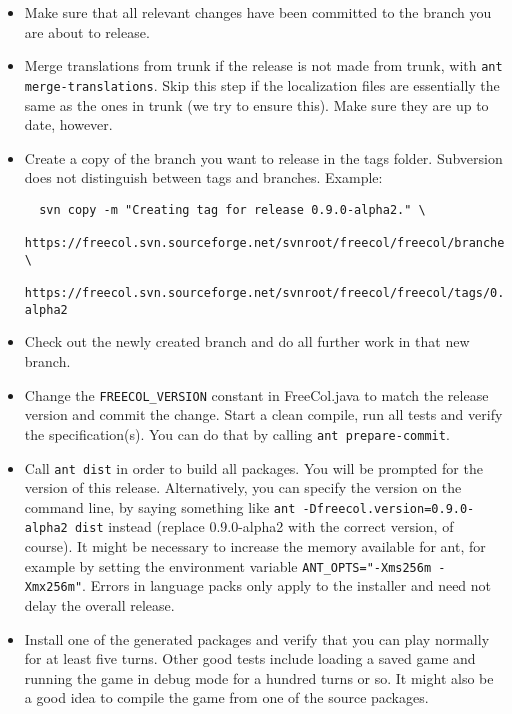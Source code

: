 \documentclass[12pt]{book}
\begin{document}
\begin{itemize}

\item Make sure that all relevant changes have been committed to the
  branch you are about to release.

\item Merge translations from trunk if the release is not made from
  trunk, with \verb+ant merge-translations+. Skip this step if the
  localization files are essentially the same as the ones in trunk (we
  try to ensure this). Make sure they are up to date, however.

\item Create a copy of the branch you want to release in the tags
  folder. Subversion does not distinguish between tags and
  branches. Example:

{\small
\begin{verbatim}
  svn copy -m "Creating tag for release 0.9.0-alpha2." \
  https://freecol.svn.sourceforge.net/svnroot/freecol/freecol/branches/0.9.x \
  https://freecol.svn.sourceforge.net/svnroot/freecol/freecol/tags/0.9.0-alpha2
\end{verbatim}
}

\item Check out the newly created branch and do all further work in that
  new branch.

\item Change the \verb$FREECOL_VERSION$ constant in FreeCol.java to
  match the release version and commit the change. Start a clean
  compile, run all tests and verify the specification(s). You can do
  that by calling \verb+ant prepare-commit+.

\item Call \verb+ant dist+ in order to build all packages. You will be
  prompted for the version of this release. Alternatively, you can
  specify the version on the command line, by saying something like
  \verb+ant -Dfreecol.version=0.9.0-alpha2 dist+ instead (replace
  0.9.0-alpha2 with the correct version, of course). It might be
  necessary to increase the memory available for ant, for example by
  setting the environment variable
  \verb+ANT_OPTS="-Xms256m -Xmx256m"+.  Errors in language packs only
  apply to the installer and need not delay the overall release.

\item Install one of the generated packages and verify that you can play
  normally for at least five turns. Other good tests include loading a
  saved game and running the game in debug mode for a hundred turns or
  so. It might also be a good idea to compile the game from one of the
  source packages.


\end{itemize}
\end{document}
